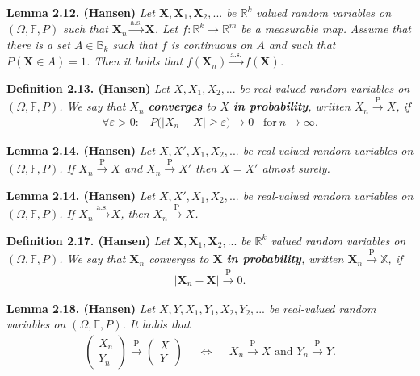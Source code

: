 \documentclass[a4paper,12pt,openany]{book}
\begin{document}
\textbf{Lemma 2.12. (Hansen)} \emph{Let \(\mathbf{X},\mathbf{X}_1,\mathbf{X}_2,...\) be \(\mathbb{R}^k\) valued random variables on \((\Omega, \mathbb{F},P)\) such that \(\mathbf{X}_n\stackrel{\text{a.s.}}{\to}\mathbf{X}\). Let \(f : \mathbb{R}^k\to\mathbb{R}^m\) be a measurable map.}
\emph{Assume that there is a set \(A\in \mathbb{B}_k\) such that \(f\) is continuous on \(A\) and such that \(P(\mathbf{X}\in A)=1\). Then it holds that \(f(\mathbf{X}_n)\stackrel{\text{a.s.}}{\to} f(\mathbf{X})\).}

\textbf{Definition 2.13. (Hansen)} \emph{Let \(X,X_1,X_2,...\) be real-valued random variables on \((\Omega,\mathbb{F},P)\). We say that \(X_n\) \textbf{converges} to \(X\) \textbf{in probability}, written \(X_n\stackrel{\text{P}}{\to} X\), if}
\begin{align*}
    \forall \varepsilon>0 :\hspace{10pt} P\big(\vert X_n-X\vert\ge \varepsilon\big)\to 0\hspace{10pt}\text{for}\ n\to \infty.\tag{2.17}
\end{align*}

\textbf{Lemma 2.14. (Hansen)} \emph{Let \(X,X',X_1,X_2,...\) be real-valued random variables on \((\Omega,\mathbb{F},P)\). If \(X_n\stackrel{\text{P}}{\to} X\) and \(X_n\stackrel{\text{P}}{\to} X'\) then \(X=X'\) almost surely.}

\textbf{Lemma 2.14. (Hansen)} \emph{Let \(X,X',X_1,X_2,...\) be real-valued random variables on \((\Omega,\mathbb{F},P)\). If \(X_n\stackrel{\text{a.s.}}{\to} X\), then \(X_n\stackrel{\text{P}}{\to} X\).}

\textbf{Definition 2.17. (Hansen)} \emph{Let \(\mathbf{X},\mathbf{X}_1,\mathbf{X}_2,...\) be \(\mathbb{R}^k\) valued random variables on \((\Omega, \mathbb{F},P)\). We say that \(\mathbf{X}_n\) converges to \(\mathbf{X}\) \textbf{in probability}, written \(\mathbf{X}_n\stackrel{\text{P}}{\to} \mathbb{X}\), if}
\begin{align*}
    \vert \mathbf{X}_n-\mathbf{X}\vert \stackrel{\text{P}}{\to} 0.\tag{2.23}
\end{align*}

\textbf{Lemma 2.18. (Hansen)} \emph{Let \(X,Y,X_1,Y_1,X_2,Y_2,...\) be real-valued random variables on \((\Omega,\mathbb{F},P)\). It holds that}
\begin{align*}
    \begin{pmatrix}
    X_n\\Y_n
    \end{pmatrix}\stackrel{\text{P}}{\to} \begin{pmatrix}
    X\\Y
    \end{pmatrix}\hspace{15pt}\iff \hspace{15pt} X_n\stackrel{\text{P}}{\to} X\text{ and }Y_n\stackrel{\text{P}}{\to} Y.\tag{2.24}
\end{align*}
\end{document}
